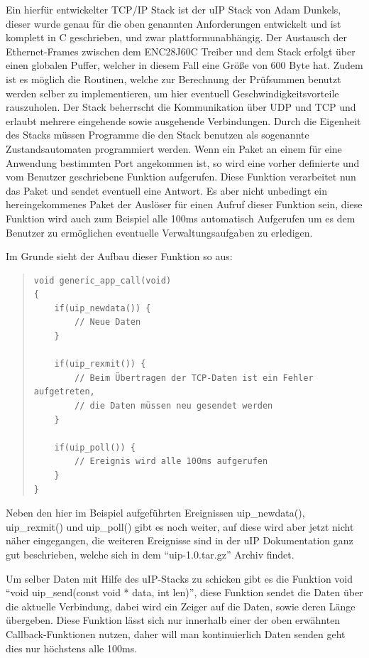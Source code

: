 \documentclass[a4paper,14pt,headsepline]{scrartcl}
\begin{document}
Ein hierfür entwickelter TCP/IP Stack ist der uIP Stack von Adam Dunkels, dieser wurde genau für die oben genannten Anforderungen entwickelt und ist komplett in C geschrieben, und zwar plattformunabhängig. Der Austausch der Ethernet-Frames zwischen dem ENC28J60C Treiber und dem Stack erfolgt über einen globalen Puffer, welcher in diesem Fall eine Größe von 600 Byte hat. Zudem ist es möglich die Routinen, welche zur Berechnung der Prüfsummen benutzt werden selber zu implementieren, um hier eventuell Geschwindigkeitsvorteile rauszuholen. Der Stack beherrscht die Kommunikation über UDP und TCP und erlaubt mehrere eingehende sowie ausgehende Verbindungen. Durch die Eigenheit des Stacks müssen Programme die den Stack benutzen als sogenannte Zustandsautomaten programmiert werden. Wenn ein Paket an einem für eine Anwendung bestimmten Port angekommen ist, so wird eine vorher definierte und vom Benutzer geschriebene Funktion aufgerufen. Diese Funktion verarbeitet nun das Paket und sendet eventuell eine Antwort. Es aber nicht unbedingt ein hereingekommenes Paket der Auslöser für einen Aufruf dieser Funktion sein, diese Funktion wird auch zum Beispiel alle 100ms automatisch Aufgerufen um es dem Benutzer zu ermöglichen eventuelle Verwaltungsaufgaben zu erledigen.

Im Grunde sieht der Aufbau dieser Funktion so aus:
\begin{quote}
\begin{verbatim}
void generic_app_call(void)
{
    if(uip_newdata()) {
        // Neue Daten
    }
    
    if(uip_rexmit()) {
        // Beim Übertragen der TCP-Daten ist ein Fehler aufgetreten,
        // die Daten müssen neu gesendet werden
    }
    
    if(uip_poll()) {
        // Ereignis wird alle 100ms aufgerufen
    }
}
\end{verbatim}
\end{quote}
Neben den hier im Beispiel aufgeführten Ereignissen uip\_newdata(), uip\_rexmit() und uip\_poll() gibt es noch weiter, auf diese wird aber jetzt nicht näher eingegangen, die weiteren Ereignisse sind in der uIP Dokumentation ganz gut beschrieben, welche sich in dem "`uip-1.0.tar.gz"' Archiv findet.

Um selber Daten mit Hilfe des uIP-Stacks zu schicken gibt es die Funktion void "`void uip\_send(const void * data, int len)"', diese Funktion sendet die Daten über die aktuelle Verbindung, dabei wird ein Zeiger auf die Daten, sowie deren Länge übergeben. Diese Funktion lässt sich nur innerhalb einer der oben erwähnten Callback-Funktionen nutzen, daher will man kontinuierlich Daten senden geht dies nur höchstens alle 100ms.
\end{document}
